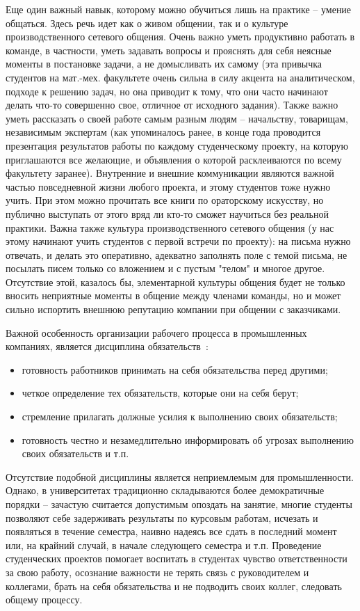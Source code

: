 \documentclass[a5paper]{article}
\begin{document}
Еще один важный навык, которому можно обучиться лишь на практике -- умение общаться. Здесь речь идет как о живом общении, так и о культуре производственного сетевого общения.  Очень важно уметь продуктивно работать в команде, в частности, уметь задавать вопросы и прояснять для себя неясные моменты в постановке задачи, а не домысливать их самому (эта привычка студентов на мат.-мех. факультете очень сильна в силу акцента на аналитическом, подходе к решению задач, но она приводит к тому, что они часто начинают делать что-то совершенно свое, отличное от исходного задания). Также важно уметь рассказать о своей работе самым разным людям -- начальству, товарищам, независимым экспертам (как упоминалось ранее, в конце года проводится презентация результатов работы по каждому студенческому проекту, на которую приглашаются все желающие, и объявления о которой расклеиваются по всему факультету заранее). Внутренние и внешние коммуникации являются важной частью повседневной жизни любого проекта, и этому студентов тоже нужно учить. При этом можно прочитать все книги по ораторскому искусству, но публично выступать от этого вряд ли кто-то сможет научиться без реальной практики. Важна также культура производственного сетевого общения (у нас этому начинают учить студентов с первой встречи по проекту): на письма нужно отвечать, и делать это оперативно, адекватно заполнять поле с темой письма, не посылать писем только со вложением и с пустым "телом" и многое другое. Отсутствие этой, казалось бы, элементарной культуры общения будет не только вносить неприятные моменты в общение между членами команды, но и может сильно испортить внешнюю репутацию компании при общении с заказчиками.

Важной особенность организации рабочего процесса в промышленных компаниях, является дисциплина обязательств~\cite{obyzat}:
\begin{itemize}
 \item готовность работников принимать на себя обязательства перед другими;
 \item четкое определение тех обязательств, которые они на себя берут;
 \item стремление прилагать должные усилия к выполнению своих обязательств;
 \item готовность честно и незамедлительно информировать об угрозах выполнению своих обязательств и т.п.
\end{itemize}
Отсутствие подобной дисциплины является неприемлемым для промышленности. Однако, в университетах традиционно складываются более демократичные порядки -- зачастую считается допустимым опоздать на занятие, многие студенты позволяют себе задерживать результаты по курсовым работам, исчезать и появляться в течение семестра, наивно надеясь все сдать в последний момент или, на крайний случай, в начале следующего семестра и т.п. Проведение студенческих проектов помогает воспитать в студентах чувство ответственности за свою работу, осознание важности не терять связь с руководителем и коллегами, брать на себя обязательства и не подводить своих коллег, следовать общему процессу.
\end{document}
